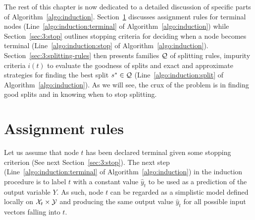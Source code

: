 
The rest of this chapter is now dedicated to a detailed discussion of specific
parts of Algorithm~\ref{algo:induction}. Section~\ref{sec:3:assignment}
discusses assignment rules for terminal nodes
(Line~\ref{algo:induction:terminal} of Algorithm~\ref{algo:induction}) while
Section~\ref{sec:3:stop} outlines stopping criteria for deciding when a node
becomes terminal (Line~\ref{algo:induction:stop} of
Algorithm~\ref{algo:induction}). Section~\ref{sec:3:splitting-rules} then
presents families ${\cal Q}$ of splitting rules, impurity criteria $i(t)$ to
evaluate the goodness of splits and exact and approximate strategies for
finding the best split $s^* \in {\cal Q}$ (Line~\ref{algo:induction:split} of
Algorithm~\ref{algo:induction}). As we will see, the crux of the problem is in
finding good splits and in knowing when to stop splitting.


\section{Assignment rules}
\label{sec:3:assignment}

Let us assume that node $t$ has been declared terminal given some stopping
criterion (See next Section~\ref{sec:3:stop}). The next step
(Line~\ref{algo:induction:terminal} of Algorithm~\ref{algo:induction}) in the
induction procedure is to label $t$ with a constant value $\widehat{y}_t$ to
be used as a prediction of the output variable $Y$. As such, node $t$ can  be
regarded as a simplistic model defined locally on ${\cal X}_t \times {\cal Y}$
and producing the same output value $\widehat{y}_t$ for all possible input
vectors falling into $t$.

